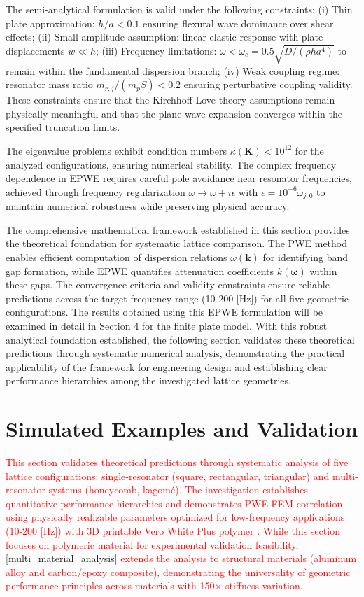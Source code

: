 \documentclass[review,numbers,sort&compress]{elsarticle}
\begin{document}
The semi-analytical formulation is valid under the following constraints: (i) Thin plate approximation: $h/a < 0.1$ ensuring flexural wave dominance over shear effects; (ii) Small amplitude assumption: linear elastic response with plate displacements $w \ll h$; (iii) Frequency limitations: $\omega < \omega_c = 0.5\sqrt{D/(\rho h a^4)}$ to remain within the fundamental dispersion branch; (iv) Weak coupling regime: resonator mass ratio $m_{r,j}/(m_p S) < 0.2$ ensuring perturbative coupling validity. These constraints ensure that the Kirchhoff-Love theory assumptions remain physically meaningful and that the plane wave expansion converges within the specified truncation limits.

The eigenvalue problems exhibit condition numbers $\kappa(\mathbf{K}) < 10^{12}$ for the analyzed configurations, ensuring numerical stability. The complex frequency dependence in EPWE requires careful pole avoidance near resonator frequencies, achieved through frequency regularization $\omega \to \omega + i\epsilon$ with $\epsilon = 10^{-6}\omega_{j,0}$ to maintain numerical robustness while preserving physical accuracy.

The comprehensive mathematical framework established in this section provides the theoretical foundation for systematic lattice comparison. The PWE method enables efficient computation of dispersion relations $\omega(\mathbf{k})$ for identifying band gap formation, while EPWE quantifies attenuation coefficients $k(\boldsymbol{\omega})$ within these gaps. The convergence criteria and validity constraints ensure reliable predictions across the target frequency range (10-200 [Hz]) for all five geometric configurations. The results obtained using this EPWE formulation will be examined in detail in Section 4 for the finite plate model. With this robust analytical foundation established, the following section validates these theoretical predictions through systematic numerical analysis, demonstrating the practical applicability of the framework for engineering design and establishing clear performance hierarchies among the investigated lattice geometries.

\section{Simulated Examples and Validation}\label{num_ex_disc}

\textcolor{red}{This section validates theoretical predictions through systematic analysis of five lattice configurations: single-resonator (square, rectangular, triangular) and multi-resonator systems (honeycomb, kagomé). The investigation establishes quantitative performance hierarchies and demonstrates PWE-FEM correlation using physically realizable parameters optimized for low-frequency applications (10-200 [Hz]) with 3D printable Vero White Plus polymer \cite{MIRANDA2019480}. While this section focuses on polymeric material for experimental validation feasibility, \ref{multi_material_analysis} extends the analysis to structural materials (aluminum alloy and carbon/epoxy composite), demonstrating the universality of geometric performance principles across materials with 150× stiffness variation.}
\end{document}
